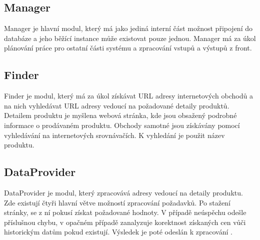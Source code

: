 \documentclass[thesis=B,czech]{FITthesis}[2012/06/26]
\begin{document}
\subsection{Manager}
Manager je hlavní modul, který má jako jediná interní část možnost připojení do databáze a jeho běžící instance může existovat pouze jednou.
Manager má za úkol plánování práce pro ostatní části systému a zpracování vstupů a výstupů z front.
\subsection{Finder}
Finder je modul, který má za úkol získávat URL adresy internetových obchodů a na nich vyhledávat URL adresy vedoucí na požadované detaily produktů.
Detailem produktu je myšlena webová stránka, kde jsou obsažený podrobné informace o prodávaném produktu. Obchody samotné jsou
získávány pomocí vyhledávání na internetových srovnávačích. K vyhledání je použit název produktu. 
\subsection{DataProvider}
DataProvider je modul, který zpracovává adresy vedoucí na detaily produktu. Zde existují čtyři hlavní větve možností zpracování požadavků.
Po stažení stránky, se z ní pokusí získat požadované
hodnoty. V případě neúspěchu odešle příslušnou chybu, v opačném případě zanalyzuje korektnost získaných cen vůči historickým datům pokud
existují. Výsledek je poté odeslán k zpracování  .
\end{document}
